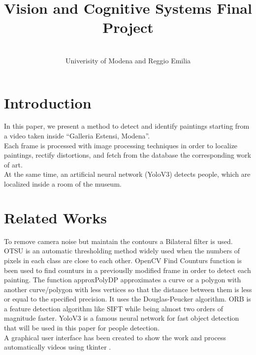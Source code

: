 \documentclass[conference]{IEEEtran}
\begin{document}
\title{Vision and Cognitive Systems Final Project}
\author{
\and
{}
\\
\large{Univerisity of Modena and Reggio Emilia}
\and
{}
}
\maketitle


\section{Introduction}
In this paper, we present a method to detect and identify paintings starting from a video taken inside “Galleria Estensi, Modena”.\\
Each frame is processed with image processing techniques in order to localize paintings, rectify distortions, and fetch from the database the corresponding work of art.\\
At the same time, an artificial neural network (YoloV3) detects people, which are localized inside a room of the museum.\\

\section{Related Works}
To remove camera noise but maintain the contours a Bilateral filter\cite{b1} is used.
OTSU\cite{b2} is an automatic thresholding method widely used when the numbers of pixels in each class are close to each other.
OpenCV Find Counturs\cite{b3} function is been used to find counturs in a previouslly modified frame in order to detect each painting.
The function approxPolyDP\cite{b4} approximates a curve or a polygon with another curve/polygon with less vertices so that the distance between them is less or equal to the specified precision. It uses the Douglas-Peucker algorithm.  
ORB\cite{b5} is a feature detection algorithm like SIFT while being almost two orders of magnitude faster.
YoloV3 \cite{b5} is a famous neural network for fast object detection that will be used in this paper for people detection.\\
A graphical user interface has been created to show the work and process automatically videos using tkinter \cite{b12}.\\
\end{document}
